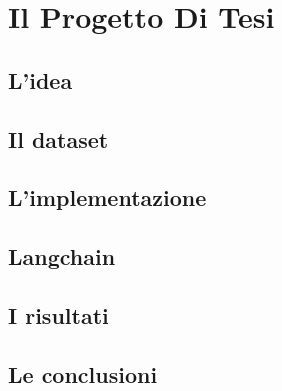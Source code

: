 \chapter{Il Progetto Di Tesi}
\section{L'idea}

\section{Il dataset}
\section{L'implementazione}
\section{Langchain}
\section{I risultati}
\section{Le conclusioni}